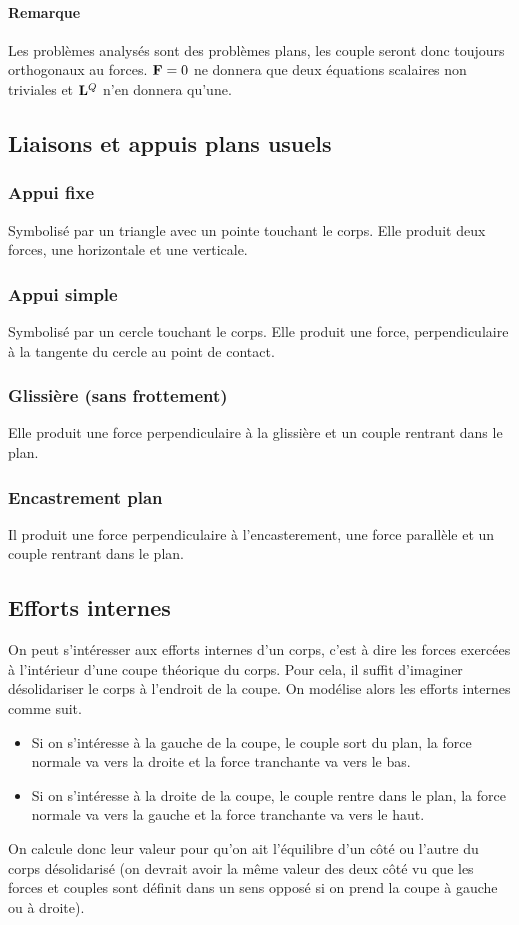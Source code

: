 \documentclass[11pt,a4paper]{article}
\newcommand\fv[1]{{\bf #1}} %
\newcommand\st{{\bf L}}
\begin{document}
\paragraph{Remarque}
Les problèmes analysés sont des problèmes plans, les couple seront donc toujours orthogonaux au forces.
$\fv{F} = 0$ ne donnera que deux équations scalaires non triviales et $\st^Q$ n'en donnera qu'une.

\subsection{Liaisons et appuis plans usuels}
\subsubsection{Appui fixe}
Symbolisé par un triangle avec un pointe touchant le corps.
Elle produit deux forces, une horizontale et une verticale.

\subsubsection{Appui simple}
Symbolisé par un cercle touchant le corps.
Elle produit une force, perpendiculaire à la tangente du cercle au point de contact.

\subsubsection{Glissière (sans frottement)}
Elle produit une force perpendiculaire à la glissière et un couple rentrant dans le plan.

\subsubsection{Encastrement plan}
Il produit une force perpendiculaire à l'encasterement, une force parallèle et un couple rentrant dans le plan.

\subsection{Efforts internes}
On peut s'intéresser aux efforts internes d'un corps, c'est à dire les forces exercées à l'intérieur d'une coupe théorique du corps.
Pour cela, il suffit d'imaginer désolidariser le corps à l'endroit de la coupe.
On modélise alors les efforts internes comme suit.
\begin{itemize}
	\item Si on s'intéresse à la gauche de la coupe, le couple sort du plan, la force normale va vers la droite et la force tranchante va vers le bas.
	\item Si on s'intéresse à la droite de la coupe, le couple rentre dans le plan, la force normale va vers la gauche et la force tranchante va vers le haut.
\end{itemize}
On calcule donc leur valeur pour qu'on ait l'équilibre d'un côté ou l'autre du corps désolidarisé (on devrait avoir la même valeur des deux côté vu que les forces et couples sont définit dans un sens opposé si on prend la coupe à gauche ou à droite).
\end{document}
